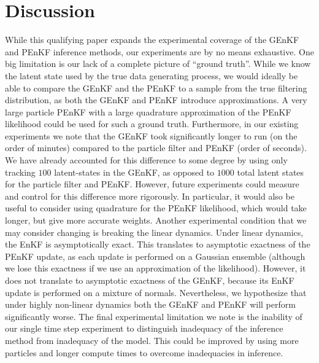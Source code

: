 \documentclass[12pt]{article}
\begin{document}

\section{Discussion}



While this qualifying paper expands the experimental coverage of the GEnKF and
PEnKF inference methods, our experiments are by no means exhaustive. One big
limitation is our lack of a complete picture of ``ground truth''. While we know
the latent state used by the true data generating process, we would ideally be
able to compare the GEnKF and the PEnKF to a sample from the true filtering
distribution, as both the GEnKF and PEnKF introduce approximations. A very large
particle PEnKF with a large quadrature approximation of the PEnKF likelihood
could be used for such a ground truth.  Furthermore, in our existing experiments
we note that the GEnKF took significantly longer to run (on the order of
minutes) compared to the particle filter and PEnKF (order of seconds). We have
already accounted for this difference to some degree by using only tracking
$100$ latent-states in the GEnKF, as opposed to $1000$ total latent states for
the particle filter and PEnKF. However, future experiments could measure and
control for this difference more rigorously.  In particular, it would also be
useful to consider using quadrature for the PEnKF likelihood, which would take
longer, but give more accurate weights. Another experimental condition that we
may consider changing is breaking the linear dynamics.  Under linear dynamics,
the EnKF is asymptotically exact. This translates to asymptotic exactness of the
PEnKF update, as each update is performed on a Gaussian ensemble (although we
lose this exactness if we use an approximation of the likelihood).  However, it
does not translate to asymptotic exactness of the GEnKF, because its EnKF update
is performed on a mixture of normals.  Nevertheless, we hypothesize that under
highly non-linear dynamics both the GEnKF and PEnKF will perform significantly
worse. The final experimental limitation we note is the inability of our single
time step experiment to distinguish inadequacy of the inference method from
inadequacy of the model. This could be improved by using more particles and
longer compute times to overcome inadequacies in inference.
\end{document}
